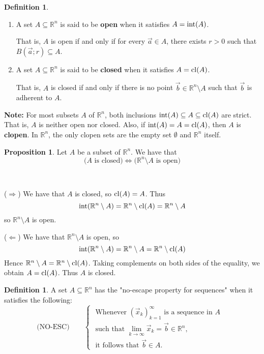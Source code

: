 \documentclass[11pt]{article}
\makeatletter
\theoremstyle{definition}
\newtheorem{defn}[thm]{Definition}
\newtheorem{prop}[thm]{Proposition}
\newcommand{\R}{\ensuremath{\mathbb{R}}}
\newenvironment{pf}[1][\proofname]{\par
  \pushQED{\qed}%
  \normalfont \topsep0\p@\relax
  \trivlist
  \item[\hskip\labelsep\itshape
  #1\@addpunct{.}]\ignorespaces
}{%
  \popQED\endtrivlist\@endpefalse
}
\makeatother
\begin{document}
\begin{defn}~\vspace{-0.35cm}

\begin{enumerate}[(1)]
\item A set $A \subseteq \R^n$ is said to be {\bf open} when it satisfies $A = {\rm int}(A)$. 

That is, $A$ is open if and only if for every $\vec{a} \in A$, there exists $r > 0$ such that $B(\vec{a}; r) \subseteq A$.

\item A set $A \subseteq \R^n$ is said to be {\bf closed} when it satisfies $A = {\rm cl}(A)$. 

That is, $A$ is closed if and only if there is no point $\vec{b} \in \R^n \setminus A$ such that $\vec{b}$ is adherent to $A$.
\end{enumerate}
\end{defn}

{\bf Note:} For most subsets $A$ of $\R^n$, both inclusions ${\rm int}(A) \subseteq A \subseteq {\rm cl}(A)$ are strict. That is, $A$ is neither open nor closed. Also, if ${\rm int}(A) = A = {\rm cl}(A)$, then $A$ is {\bf clopen}. In $\R^n$, the only clopen sets are the empty set $\emptyset$ and $\R^n$ itself.

\begin{prop} 
Let $A$ be a subset of $\R^n$. We have that
\[ \Big( \text{$A$ is closed} \Big) \Leftrightarrow \Big( \text{$\R^n \setminus A$ is open} \Big) \]
\end{prop}
\begin{pf}~ 

($\Rightarrow$) We have that $A$ is closed, so ${\rm cl}(A) = A$. Thus 
\[ {\rm int}(\R^n \setminus A) = \R^n \setminus {\rm cl}(A) = \R^n \setminus A\]
so $\R^n \setminus A$ is open.

($\Leftarrow$) We have that $\R^n \setminus A$ is open, so 
\[ {\rm int}(\R^n \setminus A) = \R^n \setminus A = \R^n \setminus {\rm cl}(A) \]
Hence $\R^n \setminus A = \R^n \setminus {\rm cl}(A)$. Taking complements on both sides of the equality, we obtain $A = {\rm cl}(A)$. Thus $A$ is closed.
\end{pf}

\begin{defn}
A set $A \subseteq \R^n$ has the "no-escape property for sequences" when it satisfies the following:
\[ \text{(NO-ESC)} \qquad \begin{cases} \text{ Whenever $(\vec{x}_k)_{k=1}^\infty$ is a sequence in $A$ } \\
\text{ such that $\lim_{k\to\infty} \vec{x}_k = \vec{b} \in \R^n$, } \\
\text{ it follows that $\vec{b} \in A$. } \end{cases} \]
\end{defn}
\end{document}

